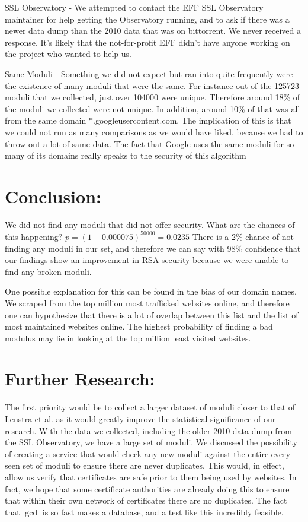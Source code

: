 \documentclass[11pt,twoside]{article}
\begin{document}
\begin{multicols}{2}
SSL Observatory - We attempted to contact the EFF SSL Observatory maintainer
for help getting the Observatory running, and to ask if there was a newer data
dump than the 2010 data that was on bittorrent. We never received a response.
It's likely that the not-for-profit EFF didn't have anyone working on the
project who wanted to help us.

Same Moduli - Something we did not expect but ran into quite frequently were the
existence of many moduli that were the same. For instance out of the 125723
moduli that we collected, just over 104000 were unique. Therefore around 18\% of
the moduli we collected were not unique. In addition, around 10\% of that was
all from the same domain $*$.googleusercontent.com. The implication of this is
that we could not run as many comparisons as we would have liked, because we
had to throw out a lot of same data. The fact that Google uses the same moduli
for so many of its domains really speaks to the security of this algorithm

\section{Conclusion:}
We did not find any moduli that did not offer security. What are the chances of
this happening?  $p = (1-0.000075)^{50000} = 0.0235$
There is a 2\% chance of not finding any moduli in our set, and therefore we can
say with 98\% confidence that our findings show an improvement in RSA security
because we were unable to find any broken moduli.

One possible explanation for this can be found in the bias of our domain names.
We scraped from the top million most trafficked websites online, and therefore
one can hypothesize that there is a lot of overlap between this list and the
list of most maintained websites online. The highest probability of finding a
bad modulus may lie in looking at the top million least visited websites. 


\section{Further Research:}
The first priority would be to collect a larger dataset of moduli closer to that
of Lenstra et al. as it would greatly improve the statistical significance of
our research. With the data we collected, including the older 2010 data dump 
from the SSL Observatory, we have a large set of moduli. We discussed the 
possibility of creating a service that would check any new moduli against the 
entire every seen set of moduli to ensure there are never duplicates. This 
would, in effect, allow us verify that certificates are safe prior to them being
used by websites. In fact, we hope that some certificate authorities are already
doing this to ensure that within their own network of certificates there are no
duplicates. The fact that $\gcd$ is so fast makes a database, and a test like
this incredibly feasible.

\end{multicols}
\end{document}
